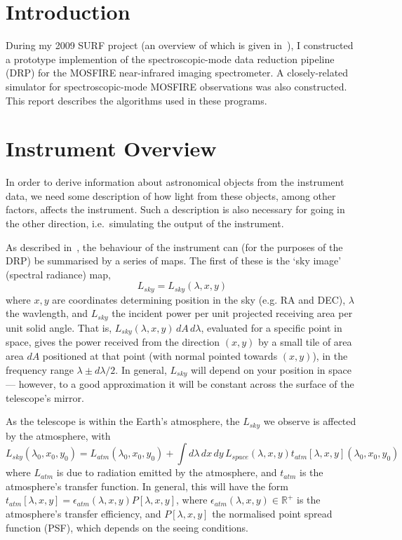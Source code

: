 \section{Introduction}

During my 2009 SURF project (an overview of which is given in~\cite{surfreport}),
I constructed a prototype implemention of the spectroscopic-mode
data reduction pipeline (DRP) for the MOSFIRE near-infrared imaging
spectrometer. A closely-related simulator for spectroscopic-mode MOSFIRE
observations was also constructed. This report describes the algorithms
used in these programs.

\section{Instrument Overview}

In order to derive information about astronomical objects
from the instrument data, we need some description of how light from these
objects, among other factors, affects the instrument. Such a description
is also necessary for going in the other direction, i.e.\ simulating
the output of the instrument.

As described in~\cite{surfreport}, the behaviour of the instrument can (for the
purposes of the DRP) be summarised by a series of maps. The first of
these is the `sky image' (spectral radiance) map,
\[
L_{sky} = L_{sky} (\lambda, x, y)
\]
where $x,y$ are coordinates determining position in the sky (e.g. RA
and DEC), $\lambda$ the wavlength, and $L_{sky}$ the incident power
per unit projected receiving area per unit solid angle. That is,
$L_{sky}(\lambda, x, y)\, dA \, d\lambda$, evaluated for a specific
point in space, gives the power received from the direction $(x,y)$
by a small tile of area area $dA$ positioned at that point (with
normal pointed towards $(x,y)$), in the frequency range $\lambda \pm
d\lambda/2$. In general, $L_{sky}$ will depend on your position in
space --- however, to a good approximation it will be constant across
the surface of the telescope's mirror.

As the telescope is within the Earth's atmosphere, the $L_{sky}$
we observe is affected by the atmosphere, with
\[
L_{sky}(\lambda_0, x_0, y_0) = L_{atm}(\lambda_0, x_0, y_0) + \int d\lambda\, dx\, dy\, L_{space}(\lambda, x, y) t_{atm}[\lambda, x, y](\lambda_0, x_0, y_0)
\]
where $L_{atm}$ is due to radiation emitted by the atmosphere, and
$t_{atm}$ is the atmosphere's transfer function. In general, this will
have the form $t_{atm}[\lambda, x, y] = \epsilon_{atm}(\lambda, x,
y) P[\lambda, x, y]$, where $\epsilon_{atm} (\lambda, x, y) \in
\mathbb{R}^+$ is the atmosphere's transfer efficiency, and $P[\lambda,
x, y]$ the normalised point spread function (PSF), which depends on the
seeing conditions.


